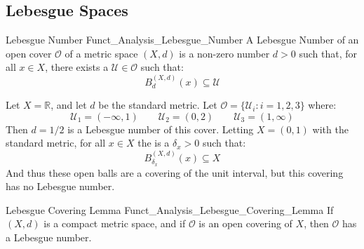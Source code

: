         \subsection{Lebesgue Spaces}
            \begin{ldefinition}{Lebesgue Number}
                  {Funct_Analysis_Lebesgue_Number}
                A Lebesgue Number of an open cover
                $\mathcal{O}$ of a metric space $(X,d)$ is
                a non-zero number $d>0$ such that, for all
                $x\in{X}$, there exists
                a $\mathcal{U}\in\mathcal{O}$ such that:
                \begin{equation}
                    B_{d}^{(X,d)}(x)\subseteq\mathcal{U}
                \end{equation}
            \end{ldefinition}
            \begin{lexample}
                Let $X=\mathbb{R}$, and let $d$ be the
                standard metric. Let
                $\mathcal{O}=\{\mathcal{U}_{i}:i=1,2,3\}$ where:
                \begin{equation}
                    \mathcal{U}_{1}=(-\infty,1)
                    \quad\quad
                    \mathcal{U}_{2}=(0,2)
                    \quad\quad
                    \mathcal{U}_{3}=(1,\infty)
                \end{equation}
                Then $d=1/2$ is a Lebesgue number of this cover.
                Letting $X=(0,1)$ with the standard metric, for all
                $x\in{X}$ the is a $\delta_{x}>0$ such that:
                \begin{equation}
                    B_{\delta_{x}}^{(X,d)}(x)
                    \subseteq{X}
                \end{equation}
                And thus these open balls are a covering of the unit
                interval, but this covering has no Lebesgue number.
            \end{lexample}
            \begin{ltheorem}{Lebesgue Covering Lemma}
                  {Funct_Analysis_Lebesgue_Covering_Lemma}
                If $(X,d)$ is a compact metric space, and if
                $\mathcal{O}$ is an open covering of $X$, then
                $\mathcal{O}$ has a Lebesgue number.
            \end{ltheorem}
